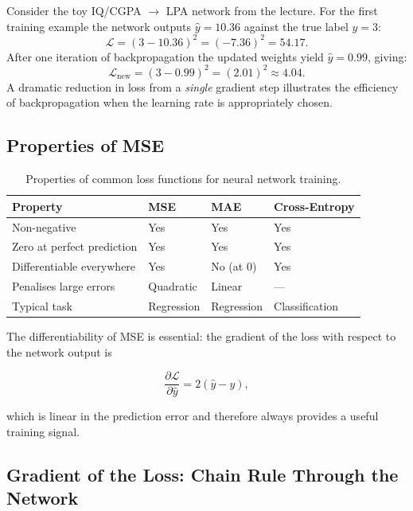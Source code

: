 \documentclass[12pt,a4paper]{article}
\newcommand{\pd}[2]{\frac{\partial #1}{\partial #2}}
\begin{document}
\begin{example}[title=Numerical MSE Computation (Slide V03)]
Consider the toy IQ/CGPA $\to$ LPA network from the lecture.  For the first
training example the network outputs $\hat{y} = 10.36$ against the true label
$y = 3$:
\[
  \mathcal{L} = (3 - 10.36)^{2} = (-7.36)^{2} = 54.17.
\]
After one iteration of backpropagation the updated weights yield
$\hat{y} = 0.99$, giving:
\[
  \mathcal{L}_{\mathrm{new}} = (3 - 0.99)^{2} = (2.01)^{2} \approx 4.04.
\]
A dramatic reduction in loss from a \emph{single} gradient step illustrates
the efficiency of backpropagation when the learning rate is appropriately
chosen.
\end{example}

\subsection{Properties of MSE}

\begin{table}[htbp]
\centering
\caption{Properties of common loss functions for neural network training.}
\label{tab:loss-comparison}
\begin{tabularx}{\linewidth}{lXXX}
\toprule
\textbf{Property} & \textbf{MSE} & \textbf{MAE} & \textbf{Cross-Entropy} \\
\midrule
Non-negative & Yes & Yes & Yes \\
Zero at perfect prediction & Yes & Yes & Yes \\
Differentiable everywhere & Yes & No (at 0) & Yes \\
Penalises large errors & Quadratic & Linear & --- \\
Typical task & Regression & Regression & Classification \\
\bottomrule
\end{tabularx}
\end{table}

The differentiability of MSE is essential: the gradient of the loss with
respect to the network output is

\begin{equation}
  \pd{\mathcal{L}}{\hat{y}} = 2(\hat{y} - y),
  \label{eq:mse-grad}
\end{equation}

which is linear in the prediction error and therefore always provides a useful
training signal.

\subsection{Gradient of the Loss: Chain Rule Through the Network}
\label{sub:chain-rule}
\end{document}
